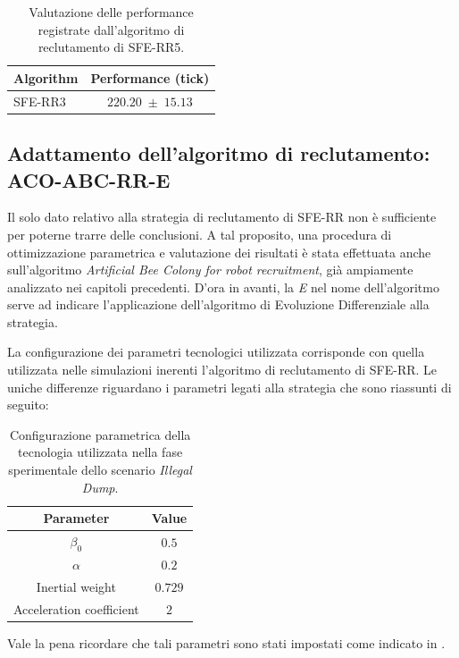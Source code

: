 \begin{table}[H]
    \centering
    \captionsetup{justification=centering, margin=2cm, font=footnotesize}
    \begin{tabular}{|l|c|}
    \hline
    \textbf{Algorithm}              & \textbf{Performance (tick)}              \\ \hline
    SFE-RR3        & $220.20 \; \pm \; 15.13$           \\ \hline
    \end{tabular}%
    
    \caption{Valutazione delle performance registrate dall'algoritmo di reclutamento di SFE-RR5.}
    \label{tabella_performance_dump}
\end{table}

\subsection{Adattamento dell'algoritmo di reclutamento: \\ACO-ABC-RR-E}

Il solo dato relativo alla strategia di reclutamento di SFE-RR non è sufficiente per poterne trarre delle conclusioni.
A tal proposito, una procedura di ottimizzazione parametrica e valutazione dei risultati è stata effettuata anche sull'algoritmo \textit{Artificial Bee Colony for robot recruitment}, già ampiamente analizzato nei capitoli precedenti.
D'ora in avanti, la \textit{E} nel nome dell'algoritmo serve ad indicare l'applicazione dell'algoritmo di Evoluzione Differenziale alla strategia.

La configurazione dei parametri tecnologici utilizzata corrisponde con quella utilizzata nelle simulazioni inerenti l'algoritmo di reclutamento di SFE-RR.
Le uniche differenze riguardano i parametri legati alla strategia che sono riassunti di seguito:

\begin{table}[H]
    \centering
    \captionsetup{justification=centering, margin=2cm, font=footnotesize}
    \begin{tabular}{|c|c|}
    \hline
    \textbf{Parameter}                      & \textbf{Value}        \\ \hline
    $\beta_{0}$                             & $0.5$                 \\ \hline
    $\alpha$                                & $0.2$                 \\ \hline
    Inertial weight                         & $0.729$               \\ \hline
    Acceleration coefficient                & $2$                   \\ \hline
    \end{tabular}%
    
    \caption{Configurazione parametrica della tecnologia utilizzata nella fase sperimentale dello scenario \textit{Illegal Dump}.}
    \label{tabella_parametri_dump_ABC}
\end{table}
Vale la pena ricordare che tali parametri sono stati impostati come indicato in \cite{palmieri2017comparison}.

